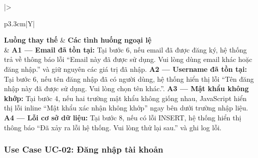 \documentclass[11pt, a4paper]{article}
\begin{document}
\begin{table}[H]
\begin{tabularx}{\linewidth}{|>{\raggedright\arraybackslash}p{3.3cm}|Y|}
        \textbf{Luồng thay thế} & \textbf{Các tình huống ngoại lệ} \\ \hline
        & \textbf{A1 --- Email đã tồn tại:} Tại bước 6, nếu email đã được đăng ký, hệ thống trả về thông báo lỗi ``Email này đã được sử dụng. Vui lòng dùng email khác hoặc đăng nhập.'' và giữ nguyên các giá trị đã nhập. \newline
          \textbf{A2 --- Username đã tồn tại:} Tại bước 6, nếu tên đăng nhập đã có người dùng, hệ thống hiển thị lỗi ``Tên đăng nhập này đã được sử dụng. Vui lòng chọn tên khác.''. \newline
          \textbf{A3 --- Mật khẩu không khớp:} Tại bước 4, nếu hai trường mật khẩu không giống nhau, JavaScript hiển thị lỗi inline ``Mật khẩu xác nhận không khớp'' ngay bên dưới trường nhập liệu. \newline
          \textbf{A4 --- Lỗi cơ sở dữ liệu:} Tại bước 8, nếu có lỗi INSERT, hệ thống hiển thị thông báo ``Đã xảy ra lỗi hệ thống. Vui lòng thử lại sau.'' và ghi log lỗi. \\ \hline
    \end{tabularx}
\end{table}

\subsubsection{Use Case UC-02: Đăng nhập tài khoản}
\end{document}
